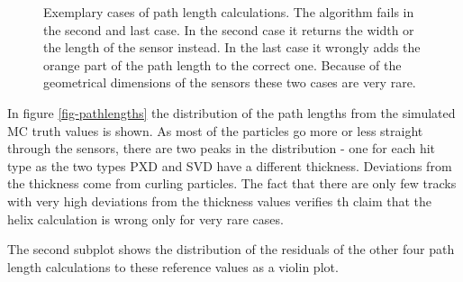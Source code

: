 \begin{figure}
  \caption[Exemplary cases of path length calculations.]{Exemplary cases of path length calculations. The algorithm fails in the second and last case. In the second case it returns the width or the length of the sensor instead. In the last case it wrongly adds the orange part of the path length to the correct one. Because of the geometrical dimensions of the sensors these two cases are very rare.}
  \label{fig-errors-in-path-length}
\end{figure}

In figure \ref{fig-pathlengths} the distribution of the path lengths from the simulated MC truth values is shown. As most of the particles go more or less straight through the sensors, there are two peaks in the distribution - one for each hit type as the two types PXD and SVD have a different thickness. Deviations from the thickness come from curling particles. The fact that there are only few tracks with very high deviations from the thickness values verifies th claim that the helix calculation is wrong only for very rare cases.

The second subplot shows the distribution of the residuals of the other four path length calculations to these reference values as a violin plot.


